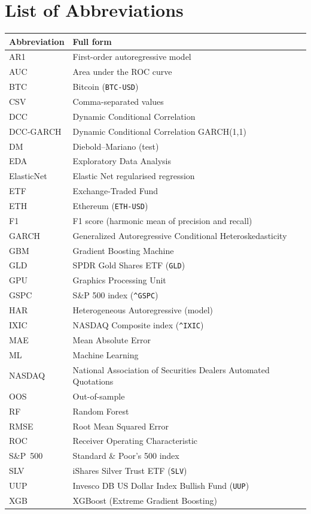 \section*{List of Abbreviations}

\begin{tabular}{@{}p{3cm}p{11cm}@{}}
    \toprule
    \textbf{Abbreviation} & \textbf{Full form} \\
    \midrule
    AR1        & First-order autoregressive model \\
    AUC        & Area under the ROC curve \\
    BTC        & Bitcoin (\texttt{BTC-USD}) \\
    CSV        & Comma-separated values \\
    DCC        & Dynamic Conditional Correlation \\
    DCC-GARCH  & Dynamic Conditional Correlation GARCH(1,1) \\
    DM         & Diebold--Mariano (test) \\
    EDA        & Exploratory Data Analysis \\
    ElasticNet & Elastic Net regularised regression \\
    ETF        & Exchange-Traded Fund \\
    ETH        & Ethereum (\texttt{ETH-USD}) \\
    F1         & F1 score (harmonic mean of precision and recall) \\
    GARCH      & Generalized Autoregressive Conditional Heteroskedasticity \\
    GBM        & Gradient Boosting Machine \\
    GLD        & SPDR Gold Shares ETF (\texttt{GLD}) \\
    GPU        & Graphics Processing Unit \\
    GSPC       & S\&P 500 index (\texttt{\^{}GSPC}) \\
    HAR        & Heterogeneous Autoregressive (model) \\
    IXIC       & NASDAQ Composite index (\texttt{\^{}IXIC}) \\
    MAE        & Mean Absolute Error \\
    ML         & Machine Learning \\
    NASDAQ     & National Association of Securities Dealers Automated Quotations \\
    OOS        & Out-of-sample \\
    RF         & Random Forest \\
    RMSE       & Root Mean Squared Error \\
    ROC        & Receiver Operating Characteristic \\
    S\&P~500   & Standard \& Poor's 500 index \\
    SLV        & iShares Silver Trust ETF (\texttt{SLV}) \\
    UUP        & Invesco DB US Dollar Index Bullish Fund (\texttt{UUP}) \\
    XGB        & XGBoost (Extreme Gradient Boosting) \\
    \bottomrule
\end{tabular}

\newpage
